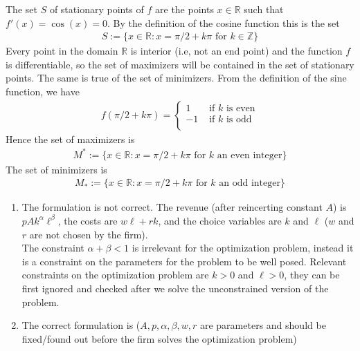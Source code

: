 \documentclass[letterpaper,10pt,english]{jupyterBook}
\begin{document}
\sphinxAtStartPar
The set \(S\) of stationary points of \(f\) are the points \(x \in \mathbb{R}\) such
that \(f'(x) = \cos(x) = 0\). By the definition of the cosine function this
is the set
\begin{equation*}
\begin{split}
S := \{ x \in \mathbb{R} : x = \pi/2 + k \pi \text{ for } k \in \mathbb{Z} \}
\end{split}
\end{equation*}
\sphinxAtStartPar
Every point in the domain \(\mathbb{R}\) is interior (i.e, not an end point) and
the function \(f\) is differentiable, so the set of maximizers will be
contained in the set of stationary points. The same is true of the set of
minimizers. From the definition of the sine function, we have
\begin{equation*}
\begin{split}
f(\pi/2 + k \pi) =
\begin{cases}
    1 & \text{ if $k$ is even} \\
    -1 & \text{ if $k$ is odd} \\
\end{cases}
\end{split}
\end{equation*}
\sphinxAtStartPar
Hence the set of maximizers is
\begin{equation*}
\begin{split}
M^* := \{ x \in \mathbb{R} : x = \pi/2 + k \pi \text{ for  } k \text{ an
even integer}\}
\end{split}
\end{equation*}
\sphinxAtStartPar
The set of minimizers is
\begin{equation*}
\begin{split}
M_* := \{ x \in \mathbb{R} : x = \pi/2 + k \pi \text{ for  } k \text{ an
odd integer}\}
\end{split}
\end{equation*}
\sphinxAtStartPar
{}
\begin{enumerate}
%
\item {} 
\sphinxAtStartPar
The formulation is not correct. The revenue (after reincerting constant \(A\)) is \(p A k^{\alpha} \ell^{\beta}\), the costs are \(w \ell + r k\), and the choice variables are \(k\) and \(\ell\) (\(w\) and \(r\) are not chosen by the firm).\\
The constraint \(\alpha + \beta < 1\) is irrelevant for the optimization problem, instead it is a constraint on the parameters for the problem to be well posed.
Relevant constraints on the optimization problem are \(k>0\) and \(\ell>0\), they can be first ignored and checked after we solve the unconstrained version of the problem.

\item {} 
\sphinxAtStartPar
The correct formulation is (\(A, p, \alpha, \beta, w, r\) are parameters and should be fixed/found out before the firm solves the optimization problem)

\end{enumerate}
\end{document}
